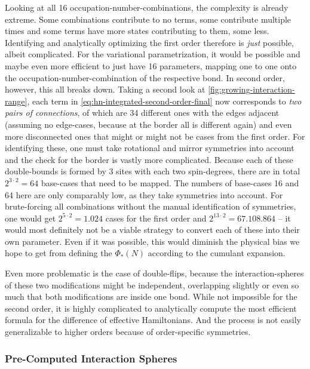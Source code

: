 Looking at all 16 occupation-number-combinations, the complexity is already extreme. 
Some combinations contribute to no terms, some contribute multiple times and some terms have more states contributing to them, some less.
Identifying and analytically optimizing the first order therefore is \emph{just} possible, albeit complicated.
For the variational parametrization, it would be possible and maybe even more efficient to just have 16 parameters, mapping one to one onto the occupation-number-combination of the respective bond. 
In second order, however, this all breaks down.
Taking a second look at \autoref{fig:growing-interaction-range}, each term in \autoref{eq:hn-integrated-second-order-final} now corresponds to \emph{two pairs of connections}, of which are 34 different ones with the edges adjacent (assuming no edge-cases, because at the border all is different again) and even more disconnected ones that might or might not be cases from the first order.
For identifying these, one must take rotational and mirror symmetries into account and the check for the border is vastly more complicated.
Because each of these double-bounds is formed by 3 sites with each two spin-degrees, there are in total $2^{3\cdot 2} = 64$ base-cases that need to be mapped.
The numbers of base-cases 16 and 64 here are only comparably low, as they take symmetries into account. 
For brute-forcing all combinations without the manual identification of symmetries, one would get $2^{5\cdot 2} = 1.024$ cases for the first order and $2^{13\cdot 2} = 67.108.864$ -- it would most definitely not be a viable strategy to convert each of these into their own parameter.
Even if it was possible, this would diminish the physical bias we hope to get from defining the $\Phi_\ast(N)$ according to the cumulant expansion.

Even more problematic is the case of double-flips, because the interaction-spheres of these two modifications might be independent, overlapping slightly or even so much that both modifications are inside one bond.
While not impossible for the second order, it is highly complicated to analytically compute the most efficient formula for the difference of effective Hamiltonians.
And the process is not easily generalizable to higher orders because of order-specific symmetries.


\subsubsection*{Pre-Computed Interaction Spheres}

